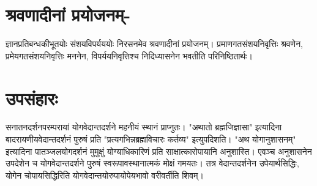 {\section*{श्रवणादीनां प्रयोजनम्-}

ज्ञानप्रतिबन्धकीभूतयोः संशयविपर्यययोः निरसनमेव श्रवणादीनां प्रयोजनम्। प्रमाणगतसंशयनिवृत्तिः श्रवणेन, प्रमेयगतसंशयनिवृत्तिः मननेन, विपर्ययनिवृत्तिश्च निदिध्यासनेन भवतीति परिनिष्ठितार्थः।

\section*{उपसंहारः}

सनातनदर्शनपरम्परायां योगवेदान्तदर्शने महनीयं स्थानं प्राप्नुतः। "अथातो ब्रह्मजिज्ञासा" इत्यादिना बादरायणीयवेदान्तदर्शनं पुरुषं प्रति "प्रत्यगभिन्नब्रह्मविचारः कर्तव्य" इत्युपदिशति। "अथ योगानुशासनम्" इत्यादिना पातञ्जलयोगदर्शनं मुमुक्षुं योग्याधिकारिणं प्रति साक्षात्कारोपायानि अनुशास्ति। एवञ्च अनुशासनेन उपदेशेन च योगवेदान्तदर्शने पुरुषं स्वरूपावस्थानात्मकं मोक्षं गमयतः। तत्र वेदान्तदर्शनेन उपेयार्थसिद्धिः, योगेन चोपायसिद्धिरिति योगवेदान्तयोरुपायोपेयभावो वरीवर्तीति शिवम्।

\articleend
}
